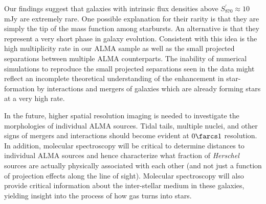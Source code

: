 \documentclass[iop]{emulateapj}
\begin{document}
Our findings suggest that galaxies with intrinsic flux densities above
$S_{870}^\prime \approx 10\,$mJy are extremely rare.  One possible explanation
for their rarity is that they are simply the tip of the mass function among
starbursts.  An alternative is that they represent a very short phase in galaxy
evolution.  Consistent with this idea is the high multiplicity rate in our ALMA
sample as well as the small projected separations between multiple ALMA
counterparts.  The inability of numerical simulations to reproduce the small
projected separations seen in the data might reflect an incomplete theoretical
understanding of the enhancement in star-formation by interactions and mergers
of galaxies which are already forming stars at a very high rate.

In the future, higher spatial resolution imaging is needed to investigate the
morphologies of individual ALMA sources.  Tidal tails, multiple nuclei, and
other signs of mergers and interactions should become evident at $0\farcs1$
resolution.  In addition, molecular spectroscopy will be critical to determine
distances to individual ALMA sources and hence characterize what fraction of
{\it Herschel} sources are actually physically associated with each other (and
not just a function of projection effects along the line of sight).  Molecular
spectroscopy will also provide critical information about the inter-stellar
medium in these galaxies, yielding insight into the process of how gas turns
into stars.
\end{document}
